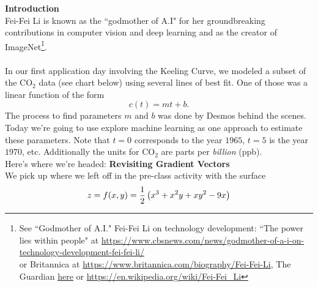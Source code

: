 \documentclass[11pt]{article}
\begin{document}
\pagestyle{otherpages}
\thispagestyle{firstpage}
\vspace*{.65in}

{\bf Introduction}\\
Fei-Fei Li is  known as the ``godmother of A.I" for her  groundbreaking contributions in computer vision and deep learning and as the creator of ImageNet\footnote{
See ``Godmother of A.I." Fei-Fei Li on technology development: ``The power lies within people" at \url{https://www.cbsnews.com/news/godmother-of-a-i-on-technology-development-fei-fei-li/}\\
 or Britannica at \url{https://www.britannica.com/biography/Fei-Fei-Li}, The Guardian \href{https://www.theguardian.com/technology/2023/nov/05/ai-pioneer-fei-fei-li-im-more-concerned-about- the-risks-that-are-here-and-now}{\underline{here}} or \url{https://en.wikipedia.org/wiki/Fei-Fei_Li} }. 
~\\\\
{
In our first application day involving the Keeling Curve, we modeled a subset of the CO$_2$ data (see chart below) using several lines of best fit. One of those was a linear function of the form $$c(t)=mt+b.$$  The process to find parameters $m$ and $b$ was done by Desmos behind the scenes.  Today we're going to use explore machine learning as one approach to estimate these parameters.    Note that $t=0$ corresponds to the year $1965$, $t=5$ is the year $1970$, etc.  Additionally the units for CO$_2$ are parts per {\em billion} (ppb).\footnotemark
{}
}~\\
Here's where we're headed:
\newpage
{\bf Revisiting Gradient Vectors}\\
We pick up where we left off in the pre-class activity with the surface $$\displaystyle z=f(x,y)=\frac{1}{2}\left( x^3 +x^2y+xy^2-9x\right)$$ 
\end{document}
